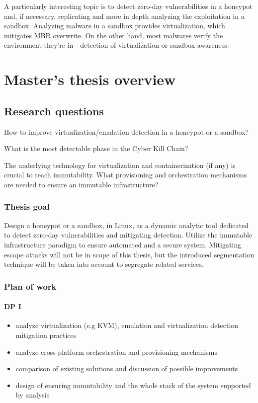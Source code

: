 \documentclass[12pt,a4paper,twoside]{report}
\begin{document}
A particularly interesting topic is to detect zero-day vulnerabilities
in a honeypot and, if necessary, replicating and more in depth analyzing
the exploitation in a sandbox. Analyzing malware in a sandbox provides
virtualization, which mitigates MBR overwrite. On the other hand, most
malwares verify the environment they're in - detection of virtualization
or sandbox awareness.

\chapter{Master's thesis overview}\label{masters-thesis-overview}

\section{Research questions}\label{research-questions}

How to improve virtualization/emulation detection in a honeypot or a
sandbox?

What is the most detectable phase in the Cyber Kill Chain?

The underlying technology for virtualization and containerization (if
any) is crucial to reach immutability. What provisioning and
orchestration mechanisms are needed to ensure an immutable
infrastructure?

\subsection{Thesis goal}\label{thesis-goal}

Design a honeypot or a sandbox, in Linux, as a dynamic analytic tool
dedicated to detect zero-day vulnerabilities and mitigating detection.
Utilize the immutable infrastructure paradigm to ensure automated and a
secure system. Mitigating escape attacks will not be in scope of this
thesis, but the introduced segmentation technique will be taken into
account to segregate related services.

\subsection{Plan of work}\label{plan-of-work}

\subsubsection{DP I}\label{dp-i}

\begin{itemize}
\item
  analyze virtualization (e.g KVM), emulation and virtualization
  detection mitigation practices
\item
  analyze cross-platform orchestration and provisioning mechanisms
\item
  comparison of existing solutions and discussion of possible
  improvements
\item
  design of ensuring immutability and the whole stack of the system
  supported by analysis
\end{itemize}
\end{document}
